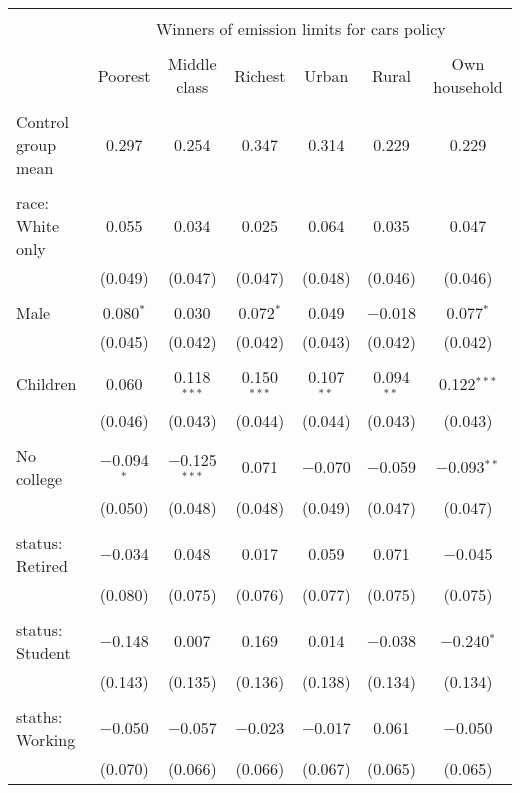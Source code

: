 
\begin{tabular}{@{\extracolsep{5pt}}lcccccc} 
\\[-1.8ex]\hline 
\hline \\[-1.8ex] 
 & \multicolumn{6}{c}{Winners of emission limits for cars policy} \\ 
\cline{2-7} 
\\[-1.8ex] & Poorest & Middle class & Richest & Urban & Rural & Own household \\ 
\hline \\[-1.8ex] 
 Control group mean & 0.297 & 0.254 & 0.347 & 0.314 & 0.229 & 0.229  \\ \hline \\[-1.8ex] race: White only & 0.055 & 0.034 & 0.025 & 0.064 & 0.035 & 0.047 \\ 
  & (0.049) & (0.047) & (0.047) & (0.048) & (0.046) & (0.046) \\ 
  & & & & & & \\ 
 Male & 0.080$^{*}$ & 0.030 & 0.072$^{*}$ & 0.049 & $-$0.018 & 0.077$^{*}$ \\ 
  & (0.045) & (0.042) & (0.042) & (0.043) & (0.042) & (0.042) \\ 
  & & & & & & \\ 
 Children & 0.060 & 0.118$^{***}$ & 0.150$^{***}$ & 0.107$^{**}$ & 0.094$^{**}$ & 0.122$^{***}$ \\ 
  & (0.046) & (0.043) & (0.044) & (0.044) & (0.043) & (0.043) \\ 
  & & & & & & \\ 
 No college & $-$0.094$^{*}$ & $-$0.125$^{***}$ & 0.071 & $-$0.070 & $-$0.059 & $-$0.093$^{**}$ \\ 
  & (0.050) & (0.048) & (0.048) & (0.049) & (0.047) & (0.047) \\ 
  & & & & & & \\ 
 status: Retired & $-$0.034 & 0.048 & 0.017 & 0.059 & 0.071 & $-$0.045 \\ 
  & (0.080) & (0.075) & (0.076) & (0.077) & (0.075) & (0.075) \\ 
  & & & & & & \\ 
 status: Student & $-$0.148 & 0.007 & 0.169 & 0.014 & $-$0.038 & $-$0.240$^{*}$ \\ 
  & (0.143) & (0.135) & (0.136) & (0.138) & (0.134) & (0.134) \\ 
  & & & & & & \\ 
 staths: Working & $-$0.050 & $-$0.057 & $-$0.023 & $-$0.017 & 0.061 & $-$0.050 \\ 
  & (0.070) & (0.066) & (0.066) & (0.067) & (0.065) & (0.065) \\ 

\end{tabular}
